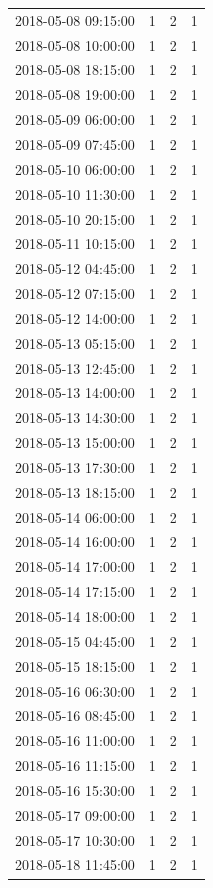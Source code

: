 \begin{tabular}{lrrr}
2018-05-08 09:15:00 & 1 & 2 & 1 \\
2018-05-08 10:00:00 & 1 & 2 & 1 \\
2018-05-08 18:15:00 & 1 & 2 & 1 \\
2018-05-08 19:00:00 & 1 & 2 & 1 \\
2018-05-09 06:00:00 & 1 & 2 & 1 \\
2018-05-09 07:45:00 & 1 & 2 & 1 \\
2018-05-10 06:00:00 & 1 & 2 & 1 \\
2018-05-10 11:30:00 & 1 & 2 & 1 \\
2018-05-10 20:15:00 & 1 & 2 & 1 \\
2018-05-11 10:15:00 & 1 & 2 & 1 \\
2018-05-12 04:45:00 & 1 & 2 & 1 \\
2018-05-12 07:15:00 & 1 & 2 & 1 \\
2018-05-12 14:00:00 & 1 & 2 & 1 \\
2018-05-13 05:15:00 & 1 & 2 & 1 \\
2018-05-13 12:45:00 & 1 & 2 & 1 \\
2018-05-13 14:00:00 & 1 & 2 & 1 \\
2018-05-13 14:30:00 & 1 & 2 & 1 \\
2018-05-13 15:00:00 & 1 & 2 & 1 \\
2018-05-13 17:30:00 & 1 & 2 & 1 \\
2018-05-13 18:15:00 & 1 & 2 & 1 \\
2018-05-14 06:00:00 & 1 & 2 & 1 \\
2018-05-14 16:00:00 & 1 & 2 & 1 \\
2018-05-14 17:00:00 & 1 & 2 & 1 \\
2018-05-14 17:15:00 & 1 & 2 & 1 \\
2018-05-14 18:00:00 & 1 & 2 & 1 \\
2018-05-15 04:45:00 & 1 & 2 & 1 \\
2018-05-15 18:15:00 & 1 & 2 & 1 \\
2018-05-16 06:30:00 & 1 & 2 & 1 \\
2018-05-16 08:45:00 & 1 & 2 & 1 \\
2018-05-16 11:00:00 & 1 & 2 & 1 \\
2018-05-16 11:15:00 & 1 & 2 & 1 \\
2018-05-16 15:30:00 & 1 & 2 & 1 \\
2018-05-17 09:00:00 & 1 & 2 & 1 \\
2018-05-17 10:30:00 & 1 & 2 & 1 \\
2018-05-18 11:45:00 & 1 & 2 & 1 \\

\end{tabular}
